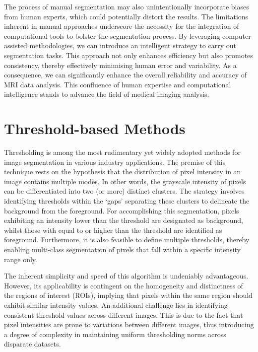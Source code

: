 The process of manual segmentation may also unintentionally incorporate biases from human experts, which could potentially distort the results. The limitations inherent in manual approaches underscore the necessity for the integration of computational tools to bolster the segmentation process. By leveraging computer-assisted methodologies, we can introduce an intelligent strategy to carry out segmentation tasks. This approach not only enhances efficiency but also promotes consistency, thereby effectively minimising human error and variability. As a consequence, we can significantly enhance the overall reliability and accuracy of MRI data analysis. This confluence of human expertise and computational intelligence stands to advance the field of medical imaging analysis.

\section{Threshold-based Methods}

Thresholding is among the most rudimentary yet widely adopted methods for image segmentation in various industry applications. The premise of this technique rests on the hypothesis that the distribution of pixel intensity in an image contains multiple modes. In other words, the grayscale intensity of pixels can be differentiated into two (or more) distinct clusters. The strategy involves identifying thresholds within the `gaps' separating these clusters to delineate the background from the foreground. For accomplishing this segmentation, pixels exhibiting an intensity lower than the threshold are designated as background, whilst those with equal to or higher than the threshold are identified as foreground. Furthermore, it is also feasible to define multiple thresholds, thereby enabling multi-class segmentation of pixels that fall within a specific intensity range only.

The inherent simplicity and speed of this algorithm is undeniably advantageous. However, its applicability is contingent on the homogeneity and distinctness of the regions of interest (ROIs), implying that pixels within the same region should exhibit similar intensity values. An additional challenge lies in identifying consistent threshold values across different images. This is due to the fact that pixel intensities are prone to variations between different images, thus introducing a degree of complexity in maintaining uniform thresholding norms across disparate datasets.

